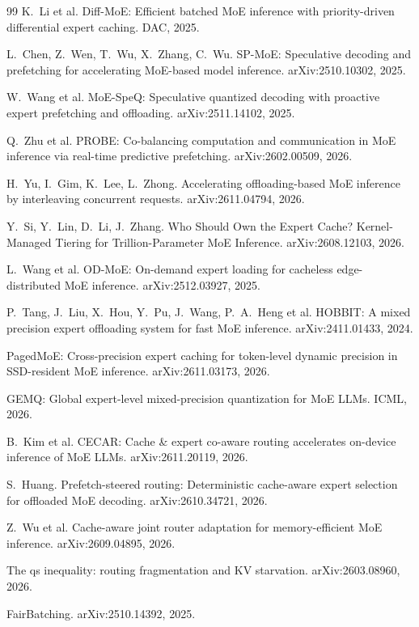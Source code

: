 \documentclass[11pt]{article}
\begin{document}
\begin{thebibliography}{99}
 K.~Li et al. Diff-MoE: Efficient batched MoE inference with
priority-driven differential expert caching. DAC, 2025.

 L.~Chen, Z.~Wen, T.~Wu, X.~Zhang, C.~Wu. SP-MoE: Speculative
decoding and prefetching for accelerating MoE-based model inference.
arXiv:2510.10302, 2025.

 W.~Wang et al. MoE-SpeQ: Speculative quantized decoding
with proactive expert prefetching and offloading. arXiv:2511.14102, 2025.

 Q.~Zhu et al. PROBE: Co-balancing computation and
communication in MoE inference via real-time predictive prefetching.
arXiv:2602.00509, 2026.

 H.~Yu, I.~Gim, K.~Lee, L.~Zhong. Accelerating
offloading-based MoE inference by interleaving concurrent requests.
arXiv:2611.04794, 2026.

 Y.~Si, Y.~Lin, D.~Li, J.~Zhang. Who Should Own the
Expert Cache? Kernel-Managed Tiering for Trillion-Parameter MoE Inference.
arXiv:2608.12103, 2026.

 L.~Wang et al. OD-MoE: On-demand expert loading for
cacheless edge-distributed MoE inference. arXiv:2512.03927, 2025.

 P.~Tang, J.~Liu, X.~Hou, Y.~Pu, J.~Wang, P.~A.~Heng et al.
HOBBIT: A mixed precision expert offloading system for fast MoE inference.
arXiv:2411.01433, 2024.

 PagedMoE: Cross-precision expert caching for token-level
dynamic precision in SSD-resident MoE inference. arXiv:2611.03173, 2026.

 GEMQ: Global expert-level mixed-precision quantization for
MoE LLMs. ICML, 2026.

 B.~Kim et al. CECAR: Cache \& expert co-aware routing
accelerates on-device inference of MoE LLMs. arXiv:2611.20119, 2026.

 S.~Huang. Prefetch-steered routing: Deterministic
cache-aware expert selection for offloaded MoE decoding. arXiv:2610.34721,
2026.

 Z.~Wu et al. Cache-aware joint router adaptation for
memory-efficient MoE inference. arXiv:2609.04895, 2026.

 The qs inequality: routing fragmentation and KV starvation.
arXiv:2603.08960, 2026.

 FairBatching. arXiv:2510.14392, 2025.


\end{thebibliography}
\end{document}
